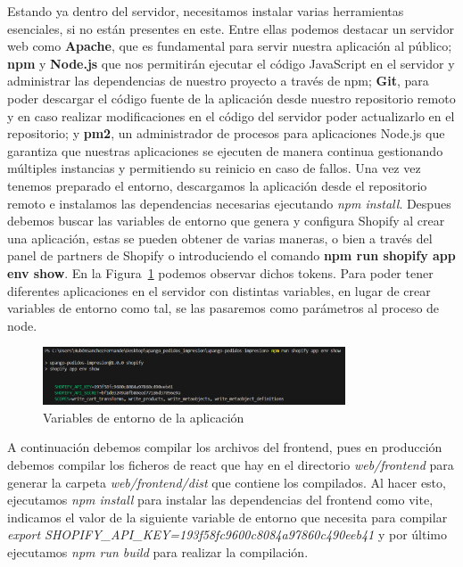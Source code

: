 \documentclass[12pt]{article}
\begin{document}
Estando ya dentro del servidor, necesitamos instalar varias herramientas esenciales, si no están presentes en este. Entre ellas podemos destacar un servidor web como \textbf{Apache}, que es fundamental para servir nuestra aplicación
al público; \textbf{npm} y \textbf{Node.js} que nos permitirán ejecutar el código JavaScript en el servidor y administrar las dependencias de nuestro proyecto a través de npm; \textbf{Git}, para poder descargar el código fuente de la aplicación desde 
nuestro repositorio remoto y en caso realizar modificaciones en el código del servidor poder actualizarlo en el repositorio; y \textbf{pm2}, un administrador de 
procesos para aplicaciones Node.js que garantiza que nuestras aplicaciones se ejecuten de manera continua gestionando múltiples instancias y permitiendo su reinicio en caso de fallos.
Una vez vez tenemos preparado el entorno, descargamos la aplicación desde el repositorio remoto e instalamos las dependencias necesarias ejecutando \textit{npm install}. Despues debemos buscar las variables de entorno que genera y configura Shopify al crear una aplicación,
estas se pueden obtener de varias maneras, o bien a través del panel de partners de Shopify o introduciendo el comando \textbf{npm run shopify app env show}. En la Figura~\ref{fig:VariablesEntorno} podemos observar dichos tokens. Para poder 
tener diferentes aplicaciones en el servidor con distintas variables, en lugar de crear variables de entorno como tal, se las pasaremos como parámetros al proceso de node.

\begin{figure}[ht]
    \centering
    \includegraphics[width=0.8\textwidth]{imagenes/variablesEntornoDespliegue.png}
    \caption{\label{fig:VariablesEntorno}Variables de entorno de la aplicación}
    \vspace{\fill}
\end{figure}

A continuación debemos compilar los archivos del frontend, pues en producción debemos compilar los ficheros de react que hay en el directorio \textit{web/frontend} 
para generar la carpeta \textit{web/frontend/dist} que contiene los compilados. Al hacer esto, ejecutamos \textit{npm install} para instalar las dependencias del frontend como vite,
indicamos el valor de la siguiente variable de entorno que necesita para compilar \textit{export SHOPIFY\_API\_KEY=193f58fc9600c8084a97860c490eeb41} y por último ejecutamos \textit{npm run build} para realizar
la compilación.
\end{document}

